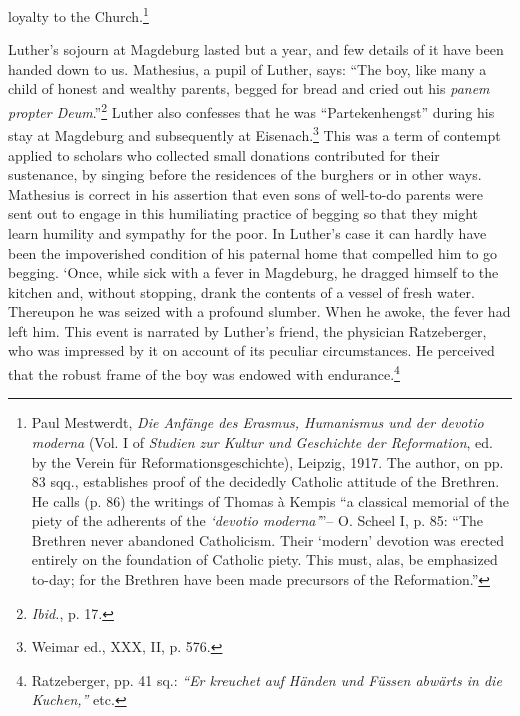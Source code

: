 loyalty to the Church.\footnote
{Paul Mestwerdt, \textit{Die Anfänge des Erasmus, Humanismus und der devotio moderna}
(Vol. I of \textit{Studien zur Kultur und Geschichte der Reformation}, ed. by the Verein für
Reformationsgeschichte), Leipzig, 1917. The author, on pp. 83 sqq., establishes proof of
the decidedly Catholic attitude of the Brethren. He calls (p. 86) the writings of Thomas
à Kempis “a classical memorial of the piety of the adherents of the \textit{‘devotio moderna’}”--
O. Scheel I, p. 85: “The Brethren never abandoned Catholicism. Their ‘modern’ devotion
was erected entirely on the foundation of Catholic piety. This must, alas, be emphasized
to-day; for the Brethren have been made precursors of the Reformation.”
}

Luther’s sojourn at Magdeburg lasted but a year, and few details
of it have been handed down to us. Mathesius, a pupil of Luther,
says: “The boy, like many a child of honest and wealthy parents,
begged for bread and cried out his \textit{panem propter Deum}.”\footnote{\textit{Ibid.}, p. 17.}
Luther
also confesses that he was “Partekenhengst” during his stay at Magdeburg
and subsequently at Eisenach.\footnote{Weimar ed., XXX, II, p. 576.}
This was a term of contempt
applied to scholars who collected small donations contributed for their
sustenance, by singing before the residences of the burghers or in other
ways. Mathesius is correct in his assertion that even sons of well-to-do
parents were sent out to engage in this humiliating practice of begging
so that they might learn humility and sympathy for the poor. In
Luther’s case it can hardly have been the impoverished condition of
his paternal home that compelled him to go begging.
‘Once, while sick with a fever in Magdeburg, he dragged himself to
the kitchen and, without stopping, drank the contents of a vessel of
fresh water. Thereupon he was seized with a profound slumber. When
he awoke, the fever had left him. This event is narrated by Luther’s
friend, the physician Ratzeberger, who was impressed by it on account
of its peculiar circumstances. He perceived that the robust
frame of the boy was endowed with endurance.\footnote{Ratzeberger, pp. 41 sq.: \textit{“Er kreuchet auf Händen und Füssen abwärts in die Kuchen,”} etc.}

